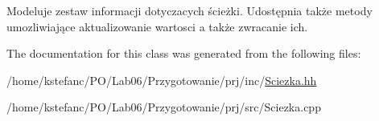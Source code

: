 Modeluje zestaw informacji dotyczacych ścieżki. Udostępnia także metody umozliwiające aktualizowanie wartosci a także zwracanie ich. 

The documentation for this class was generated from the following files\+:\begin{DoxyCompactItemize}
\item 
/home/kstefanc/\+P\+O/\+Lab06/\+Przygotowanie/prj/inc/\hyperlink{_sciezka_8hh}{Sciezka.\+hh}\item 
/home/kstefanc/\+P\+O/\+Lab06/\+Przygotowanie/prj/src/Sciezka.\+cpp\end{DoxyCompactItemize}
